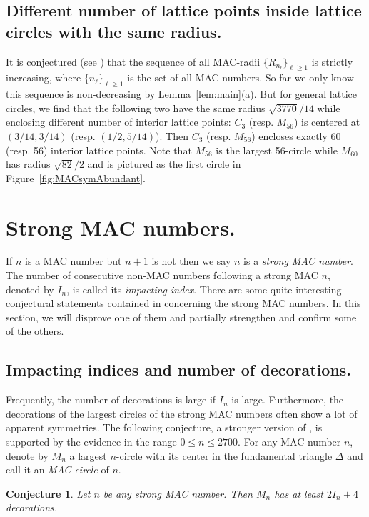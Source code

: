 \documentclass{article}
\theoremstyle{theorem}
\newtheorem{conjecture}[theorem]{Conjecture}
\theoremstyle{definition}
\begin{document}
\subsection{Different number of lattice points inside lattice circles with the same radius.}
It is conjectured (see \cite[Conjecture 3(3)]{Zhao2025Aug}) that the sequence of all MAC-radii $\{R_{n_\ell}\}_{\ell\ge 1}$ is strictly increasing, where $\{n_\ell\}_{\ell\ge 1}$ is the set of all MAC numbers. So far we only know this sequence is non-decreasing by Lemma~\ref{lem:main}(a).
But for general lattice circles, we find that the following two have the same radius $\sqrt{3770}/14$ while enclosing different number of interior lattice points: $C_3$ (resp. $M_{56}$) is centered at $(3/14,3/14)$ (resp. $(1/2,5/14)$). Then $C_3$ (resp. $M_{56}$) encloses exactly 60 (resp. 56) interior lattice points. Note that $M_{56}$ is the largest 56-circle while $M_{60}$ has radius $\sqrt{82}/2$ and is pictured as the first circle in Figure~\ref{fig:MACsymAbundant}.

\section{Strong MAC numbers.}
If $n$ is a MAC number but $n+1$ is not then we say $n$ is a \emph{strong MAC number}. The number of consecutive non-MAC numbers following a strong MAC $n$, denoted by $I_n$, is called its \emph{impacting index}. There are some quite interesting conjectural statements contained in \cite[Conjecture 3]{Zhao2025Aug} concerning the strong MAC numbers. In this section, we will disprove one of them and partially strengthen and confirm some of the others.


\subsection{Impacting indices and number of decorations.}
Frequently, the number of decorations is large if $I_n$ is large. Furthermore, the decorations of the largest circles of the strong MAC numbers often show a lot of apparent symmetries. The following conjecture, a stronger version of \cite[Conjecture 3, (9) and (13)]{Zhao2025Aug}, is supported by the evidence in the range $0\le n\le 2700$. For any MAC number $n$, denote by $M_n$ a largest $n$-circle with its center in the fundamental triangle $\Delta$ and call it an \emph{MAC circle} of $n$.

\begin{conjecture}\label{conj:DecorStrongMAC}
Let $n$ be any strong MAC number. Then $M_n$ has at least $2I_n+4$ decorations.
\end{conjecture}
\end{document}
